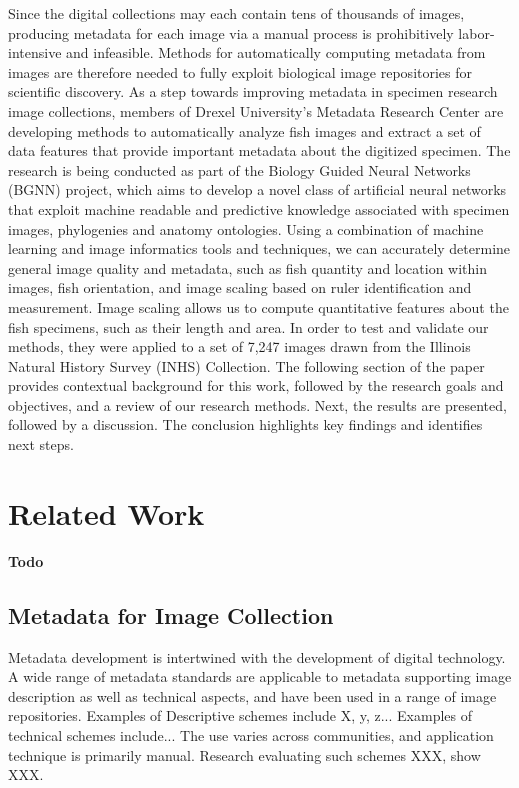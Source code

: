 \documentclass[screen,review]{acmart}
\begin{document}
Since the digital collections may each contain tens of thousands of images, producing metadata for each image via a manual process is prohibitively labor-intensive and infeasible. Methods for automatically computing metadata from images are therefore needed to fully exploit biological image repositories for scientific discovery.
As a step towards improving metadata in specimen research image collections, members of Drexel University's Metadata Research Center are developing methods to automatically analyze fish images and
extract a set of data features that provide important metadata about the
digitized specimen.
The research is being conducted as part of the Biology Guided Neural Networks (BGNN) project, which aims to develop a novel class of artificial neural networks that exploit machine readable and predictive knowledge associated with specimen images, phylogenies and anatomy ontologies.
Using a combination of machine learning and image informatics tools and techniques, we can accurately determine general image quality and metadata, such as fish quantity and location within images, fish orientation, and
image scaling based on ruler identification and measurement. Image scaling
allows us to compute quantitative features about the fish specimens, such
as their length and area.  In order to test and validate our methods, they
were  applied to a set of 7,247
images drawn from the Illinois Natural History Survey (INHS) Collection.
The following section of the paper provides contextual background for this work, followed by the research goals and objectives, and a review of our research methods. Next, the results are presented, followed by a discussion. The conclusion highlights key findings and identifies next steps.

\section{Related Work}
\textbf{Todo}
\subsection{Metadata for Image Collection}
Metadata development is intertwined with the development of digital technology. A wide range of metadata standards are applicable to metadata supporting image description as well as technical aspects, and have been used in a range of image repositories. Examples of Descriptive schemes include X, y, z... Examples of technical schemes include... The use varies across communities, and application technique is primarily manual. Research evaluating such schemes XXX, show XXX. 
\end{document}
